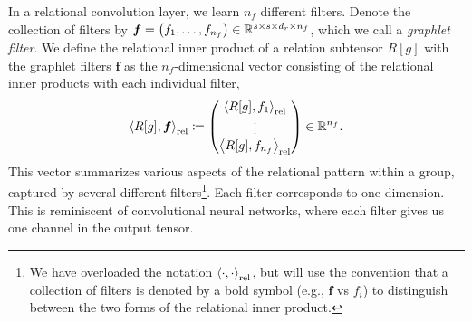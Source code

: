 

In a relational convolution layer, we learn $n_f$ different filters. Denote the collection of filters by $\boldsymbol{f} = \left(f_1, \ldots, f_{n_f}\right) \in \mathbb{R}^{s \times s \times d_r \times n_f}$, which we call a \textit{graphlet filter}. We define the relational inner product of a relation subtensor $R[g]$ with the graphlet filters $\bm{f}$ as the $n_f$-dimensional vector consisting of the relational inner products with each individual filter,
\begin{equation}
    \label{eq:relational_inner_prod}
    \left\langle R[g], \bm{f} \right\rangle_\mathrm{rel} \coloneq \begin{pmatrix} \left\langle R[g], f_1 \right\rangle_\mathrm{rel} \\ \vdots 
 \\ \left\langle R[g], f_{n_f} \right\rangle_\mathrm{rel} \end{pmatrix} \in \mathbb{R}^{n_f}.
\end{equation}
This vector summarizes various aspects of the relational pattern within a group, captured by several different filters\footnote{We have overloaded the notation $\left\langle \cdot, \cdot \right\rangle_\mathrm{rel}$, but will use the convention that a collection of filters is denoted by a bold symbol (e.g., $\bm{f}$ vs $f_i$) to distinguish between the two forms of the relational inner product.}. Each filter corresponds to one dimension. This is reminiscent of convolutional neural networks, where each filter gives us one channel in the output tensor.

